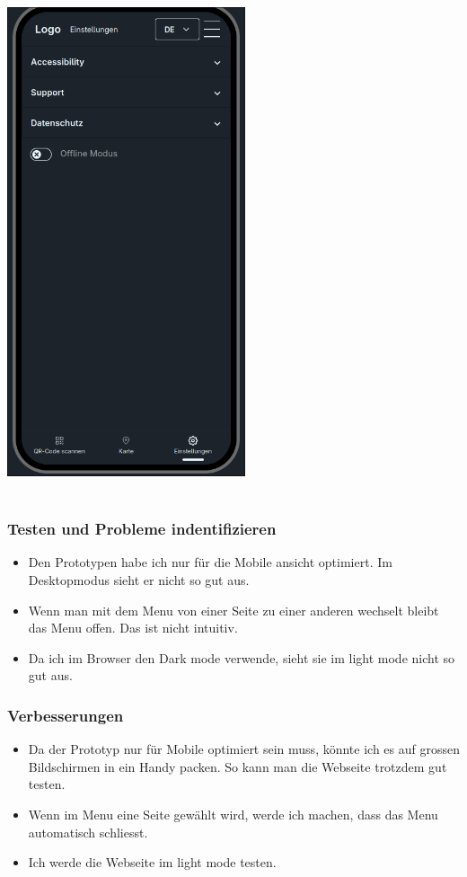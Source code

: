 \documentclass[10pt]{article}
\begin{document}
	\includegraphics[width=7cm]{settingspage}
	\\\\
	\subsubsection{Testen und Probleme indentifizieren}
	\begin{itemize}
		\item Den Prototypen habe ich nur für die Mobile ansicht optimiert. Im Desktopmodus sieht er nicht so gut aus.
		\item Wenn man mit dem Menu von einer Seite zu einer anderen wechselt bleibt das Menu offen. Das ist nicht intuitiv.
		\item Da ich im Browser den Dark mode verwende, sieht sie im light mode nicht so gut aus.
	\end{itemize}
	\subsubsection{Verbesserungen}
	\begin{itemize}
		\item Da der Prototyp nur für Mobile optimiert sein muss, könnte ich es auf grossen Bildschirmen in ein Handy packen. So kann man die Webseite trotzdem gut testen.
		\item Wenn im Menu eine Seite gewählt wird, werde ich machen, dass das Menu automatisch schliesst.
		\item Ich werde die Webseite im light mode testen.
	\end{itemize}
	
\end{document}
